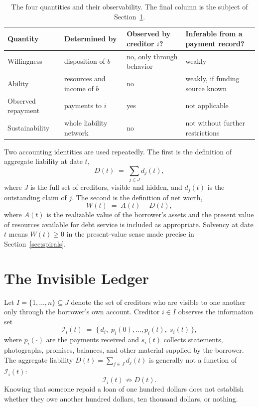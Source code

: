 \documentclass[11pt]{article}
\theoremstyle{definition}
\theoremstyle{remark}
\newcommand{\I}{\mathcal{I}}
\begin{document}
\begin{table}[ht]
\centering
\small\begin{tabular}{p{2.6cm}p{3.4cm}p{3.2cm}p{3.6cm}}
\toprule
Quantity & Determined by & Observed by creditor $i$? & Inferable from a payment record? \\
\midrule
Willingness & disposition of $b$ & no, only through behavior & weakly \\
Ability & resources and income of $b$ & no & weakly, if funding source known \\
Observed repayment & payments to $i$ & yes & not applicable \\
Sustainability & whole liability network & no & not without further restrictions \\
\bottomrule
\end{tabular}
\caption{The four quantities and their observability. The final column is the subject of Section~\ref{sec:ledger}.}\label{tab:four}
\end{table}

Two accounting identities are used repeatedly. The first is the definition of aggregate liability at date $t$,
\[
D(t) \;=\; \sum_{j\in J} d_j(t),
\]
where $J$ is the full set of creditors, visible and hidden, and $d_j(t)$ is the outstanding claim of $j$. The second is the definition of net worth,
\[
W(t) \;=\; A(t) - D(t),
\]
where $A(t)$ is the realizable value of the borrower's assets and the present value of resources available for debt service is included as appropriate. Solvency at date $t$ means $W(t)\ge 0$ in the present-value sense made precise in Section~\ref{sec:spirals}.

\section{The Invisible Ledger}\label{sec:ledger}

Let $I=\{1,\ldots,n\}\subseteq J$ denote the set of creditors who are visible to one another only through the borrower's own account. Creditor $i\in I$ observes the information set
\[
\I_i(t) \;=\; \{\,d_i,\; p_i(0),\ldots,p_i(t),\; s_i(t)\,\},
\]
where $p_i(\cdot)$ are the payments received and $s_i(t)$ collects statements, photographs, promises, balances, and other material supplied by the borrower. The aggregate liability $D(t)=\sum_{j\in J}d_j(t)$ is generally not a function of $\I_i(t)$:
\[
\I_i(t)\not\Rightarrow D(t).
\]
Knowing that someone repaid a loan of one hundred dollars does not establish whether they owe another hundred dollars, ten thousand dollars, or nothing.
\end{document}
